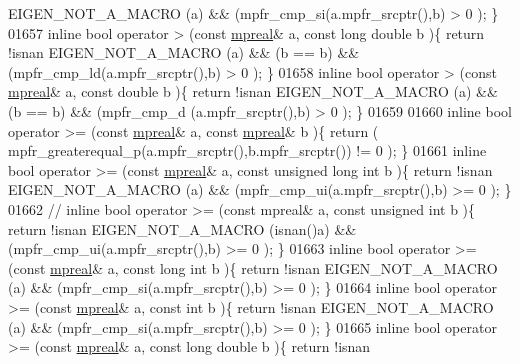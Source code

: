 \begin{DoxyCode}
      EIGEN\_NOT\_A\_MACRO (a) && (mpfr\_cmp\_si(a.mpfr\_srcptr(),b) > 0 );                 \}
01657 \textcolor{keyword}{inline} \textcolor{keywordtype}{bool} operator >  (\textcolor{keyword}{const} \hyperlink{classmpfr_1_1mpreal}{mpreal}& a, \textcolor{keyword}{const} \textcolor{keywordtype}{long} \textcolor{keywordtype}{double} b       )\{  \textcolor{keywordflow}{return} !isnan 
      EIGEN\_NOT\_A\_MACRO (a) && (b == b) && (mpfr\_cmp\_ld(a.mpfr\_srcptr(),b) > 0 );    \}
01658 \textcolor{keyword}{inline} \textcolor{keywordtype}{bool} operator >  (\textcolor{keyword}{const} \hyperlink{classmpfr_1_1mpreal}{mpreal}& a, \textcolor{keyword}{const} \textcolor{keywordtype}{double} b            )\{  \textcolor{keywordflow}{return} !isnan 
      EIGEN\_NOT\_A\_MACRO (a) && (b == b) && (mpfr\_cmp\_d (a.mpfr\_srcptr(),b) > 0 );    \}
01659 
01660 \textcolor{keyword}{inline} \textcolor{keywordtype}{bool} operator >= (\textcolor{keyword}{const} \hyperlink{classmpfr_1_1mpreal}{mpreal}& a, \textcolor{keyword}{const} \hyperlink{classmpfr_1_1mpreal}{mpreal}& b           )\{  \textcolor{keywordflow}{return} (
      mpfr\_greaterequal\_p(a.mpfr\_srcptr(),b.mpfr\_srcptr()) != 0 );       \}
01661 \textcolor{keyword}{inline} \textcolor{keywordtype}{bool} operator >= (\textcolor{keyword}{const} \hyperlink{classmpfr_1_1mpreal}{mpreal}& a, \textcolor{keyword}{const} \textcolor{keywordtype}{unsigned} \textcolor{keywordtype}{long} \textcolor{keywordtype}{int} b )\{  \textcolor{keywordflow}{return} !isnan 
      EIGEN\_NOT\_A\_MACRO (a) && (mpfr\_cmp\_ui(a.mpfr\_srcptr(),b) >= 0 );                \}
01662 \textcolor{comment}{// inline bool operator >= (const mpreal& a, const unsigned int b      )\{  return !isnan EIGEN\_NOT\_A\_MACRO
       (isnan()a) && (mpfr\_cmp\_ui(a.mpfr\_srcptr(),b) >= 0 );                \}}
01663 \textcolor{keyword}{inline} \textcolor{keywordtype}{bool} operator >= (\textcolor{keyword}{const} \hyperlink{classmpfr_1_1mpreal}{mpreal}& a, \textcolor{keyword}{const} \textcolor{keywordtype}{long} \textcolor{keywordtype}{int} b          )\{  \textcolor{keywordflow}{return} !isnan 
      EIGEN\_NOT\_A\_MACRO (a) && (mpfr\_cmp\_si(a.mpfr\_srcptr(),b) >= 0 );                \}
01664 \textcolor{keyword}{inline} \textcolor{keywordtype}{bool} operator >= (\textcolor{keyword}{const} \hyperlink{classmpfr_1_1mpreal}{mpreal}& a, \textcolor{keyword}{const} \textcolor{keywordtype}{int} b               )\{  \textcolor{keywordflow}{return} !isnan 
      EIGEN\_NOT\_A\_MACRO (a) && (mpfr\_cmp\_si(a.mpfr\_srcptr(),b) >= 0 );                \}
01665 \textcolor{keyword}{inline} \textcolor{keywordtype}{bool} operator >= (\textcolor{keyword}{const} \hyperlink{classmpfr_1_1mpreal}{mpreal}& a, \textcolor{keyword}{const} \textcolor{keywordtype}{long} \textcolor{keywordtype}{double} b       )\{  \textcolor{keywordflow}{return} !isnan 

\end{DoxyCode}
